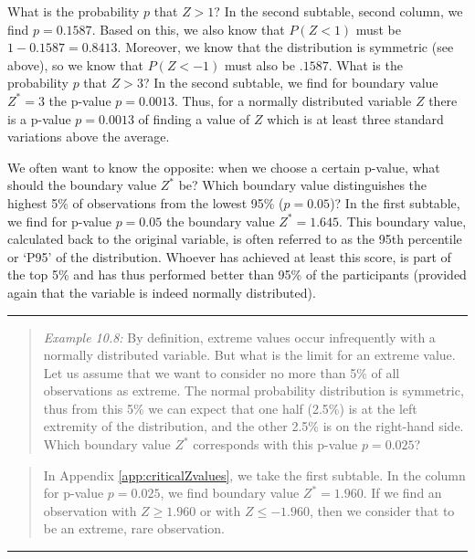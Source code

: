 \documentclass[
]{book}
\begin{document}
What is the probability \(p\) that \(Z>1\)? In the second subtable, second column,
we find \(p=0.1587\). Based on this, we also know that \(P(Z<1)\) must be
\(1-0.1587=0.8413\). Moreover, we know that the distribution is symmetric
(see above), so we know that \(P(Z< -1)\) must also be \(.1587\).
What is the probability \(p\) that \(Z>3\)? In the second subtable, we find
for boundary value \(Z^*=3\) the p-value
\(p=0.0013\). Thus, for a normally distributed variable \(Z\)
there is a p-value \(p=0.0013\) of finding a value of \(Z\)
which is at least three standard variations above the average.

We often want to know the opposite: when we choose a certain p-value,
what should the boundary value \(Z^*\) be?
Which boundary value distinguishes the highest 5\% of observations from the
lowest 95\% (\(p=0.05\))? In the first subtable, we find for p-value
\(p=0.05\) the boundary value \(Z^*=1.645\). This boundary value, calculated back
to the original variable, is often referred to as the 95th percentile or
`P95' of the distribution. Whoever has achieved at least this score,
is part of the top 5\% and has thus performed better than
95\% of the participants
(provided again that the variable is indeed normally distributed).

\begin{center}\rule{0.5\linewidth}{0.5pt}\end{center}

\begin{quote}
\emph{Example 10.8:}
By definition, extreme values occur infrequently with a normally distributed
variable. But what is the limit for an extreme value. Let us assume that
we want to consider no more than 5\% of all observations as extreme.
The normal probability distribution is symmetric, thus from this 5\% we can
expect that one half (2.5\%) is at the left extremity of the distribution,
and the other 2.5\% is on the right-hand side. Which boundary value \(Z^*\)
corresponds with this p-value \(p=0.025\)?
\end{quote}

\begin{quote}
In
Appendix \ref{app:criticalZvalues}, we take the first subtable. In the column
for p-value \(p=0.025\), we find boundary value
\(Z^*=1.960\). If we find an observation with \(Z \ge 1.960\) or with
\(Z \le -1.960\), then we consider that to be an extreme, rare
observation.
\end{quote}

\begin{center}\rule{0.5\linewidth}{0.5pt}\end{center}
\end{document}

